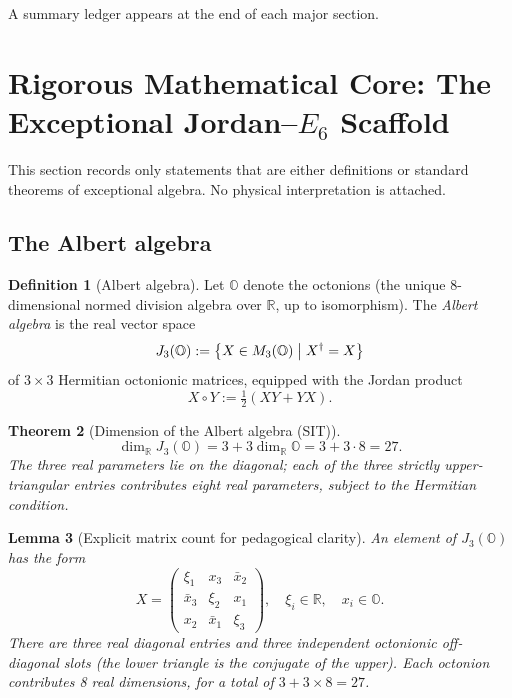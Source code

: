 \documentclass[11pt]{article}
\theoremstyle{plain}
\newtheorem{theorem}{Theorem}[section]
\newtheorem{lemma}[theorem]{Lemma}
\theoremstyle{definition}
\newtheorem{definition}[theorem]{Definition}
\theoremstyle{remark}
\numberwithin{equation}{section}
\newcommand{\R}{\mathbb{R}}
\newcommand{\Oct}{\mathbb{O}}
\begin{document}
A summary ledger appears at the end of each major section.

\section{Rigorous Mathematical Core: The Exceptional Jordan--$E_6$ Scaffold}
\label{sec:core}

This section records only statements that are either definitions or standard theorems of exceptional algebra. No physical interpretation is attached.

\subsection{The Albert algebra}

\begin{definition}[Albert algebra]\label{def:albert}
Let $\Oct$ denote the octonions (the unique 8-dimensional normed division algebra over $\R$, up to isomorphism). The \emph{Albert algebra} is the real vector space
\[
J_3(\Oct) := \bigl\{ X \in M_3(\Oct) \bigm| X^\dagger = X \bigr\}
\]
of $3\times 3$ Hermitian octonionic matrices, equipped with the Jordan product
\[
X\circ Y := \tfrac12(XY+YX).
\]
\end{definition}

\begin{theorem}[Dimension of the Albert algebra (SIT)]\label{thm:dim-j}
\[
\dim_{\R} J_3(\Oct) = 3 + 3\dim_{\R}\Oct = 3 + 3\cdot 8 = 27.
\]
The three real parameters lie on the diagonal; each of the three strictly upper-triangular entries contributes eight real parameters, subject to the Hermitian condition.
\end{theorem}

\begin{lemma}[Explicit matrix count for pedagogical clarity]
An element of $J_3(\Oct)$ has the form
\[
X = \begin{pmatrix}
\xi_1 & x_3 & \bar x_2 \\
\bar x_3 & \xi_2 & x_1 \\
x_2 & \bar x_1 & \xi_3
\end{pmatrix},
\quad \xi_i \in \R, \quad x_i \in \Oct.
\]
There are three real diagonal entries and three independent octonionic off-diagonal slots (the lower triangle is the conjugate of the upper). Each octonion contributes 8 real dimensions, for a total of $3 + 3 \times 8 = 27$.
\end{lemma}
\end{document}
